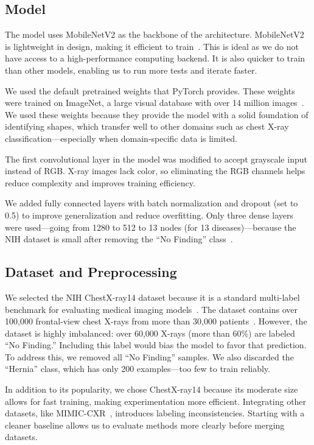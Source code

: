 \documentclass[12pt]{article}
\begin{document}
\begin{multicols}{2}
\subsection{Model}

The model uses MobileNetV2 as the backbone of the architecture. MobileNetV2 is lightweight in design, making it efficient to train~\cite{howard2019mobilenetv2}. This is ideal as we do not have access to a high-performance computing backend. It is also quicker to train than other models, enabling us to run more tests and iterate faster.

We used the default pretrained weights that PyTorch provides. These weights were trained on ImageNet, a large visual database with over 14 million images~\cite{imagenet}. We used these weights because they provide the model with a solid foundation of identifying shapes, which transfer well to other domains such as chest X-ray classification—especially when domain-specific data is limited.

The first convolutional layer in the model was modified to accept grayscale input instead of RGB. X-ray images lack color, so eliminating the RGB channels helps reduce complexity and improves training efficiency.

We added fully connected layers with batch normalization and dropout (set to 0.5) to improve generalization and reduce overfitting. Only three dense layers were used—going from 1280 to 512 to 13 nodes (for 13 diseases)—because the NIH dataset is small after removing the “No Finding” class~\cite{nih_dataset}.

\subsection{Dataset and Preprocessing}

We selected the NIH ChestX-ray14 dataset because it is a standard multi-label benchmark for evaluating medical imaging models~\cite{wang2017chestx}. The dataset contains over 100,000 frontal-view chest X-rays from more than 30,000 patients~\cite{nih_dataset}. However, the dataset is highly imbalanced: over 60,000 X-rays (more than 60\%) are labeled “No Finding.” Including this label would bias the model to favor that prediction. To address this, we removed all “No Finding” samples. We also discarded the “Hernia” class, which has only 200 examples—too few to train reliably.

In addition to its popularity, we chose ChestX-ray14 because its moderate size allows for fast training, making experimentation more efficient. Integrating other datasets, like MIMIC-CXR~\cite{mimic}, introduces labeling inconsistencies. Starting with a cleaner baseline allows us to evaluate methods more clearly before merging datasets.


\end{multicols}
\end{document}
